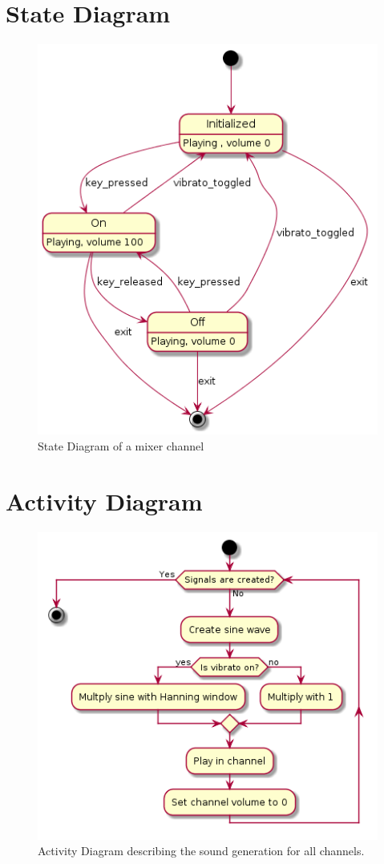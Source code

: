 \documentclass[margin,line,a4paper,authoryear,12pt]{report}
\begin{document}
\section{State Diagram}
\begin{figure}[h!]
    \centering
    \includegraphics[width=0.5\linewidth]{UML/StateDiagram.png}
    \caption{State Diagram of a mixer channel}
    \label{fig:StateDiagram}
\end{figure}
\section{Activity Diagram}
\begin{figure}[h!]
    \centering
    \includegraphics[width=0.5\linewidth]{UML/ActivityDiagram.png}
    \caption{Activity Diagram describing the sound generation for all channels.}
    \label{fig:ActivityDiagram}
\end{figure}
\end{document}
